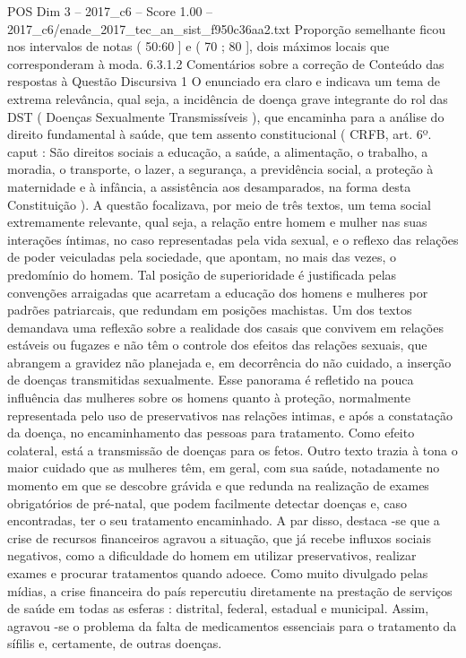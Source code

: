 \begin{textsample}{POS Dim 3 – 2017\_c6 – Score 1.00 – 2017\_c6/enade\_2017\_tec\_an\_sist\_f950c36aa2.txt}
Proporção semelhante ficou nos intervalos de notas ( 50:60 ] e ( 70 ; 80 ], dois máximos locais que corresponderam à moda. 6.3.1.2 Comentários sobre a correção de Conteúdo das respostas à Questão Discursiva 1 O enunciado era claro e indicava um tema de extrema relevância, qual seja, a incidência de doença grave integrante do rol das DST ( Doenças Sexualmente Transmissíveis ), que encaminha para a análise do direito fundamental à saúde, que tem assento constitucional ( CRFB, art. 6º. caput : São direitos sociais a educação, a saúde, a alimentação, o trabalho, a moradia, o transporte, o lazer, a segurança, a previdência social, a proteção à maternidade e à infância, a assistência aos desamparados, na forma desta Constituição ).
A questão focalizava, por meio de três textos, um tema social extremamente relevante, qual seja, a relação entre homem e mulher nas suas interações íntimas, no caso representadas pela vida sexual, e o reflexo das relações de poder veiculadas pela sociedade, que apontam, no mais das vezes, o predomínio do homem.
Tal posição de superioridade é justificada pelas convenções arraigadas que acarretam a educação dos homens e mulheres por padrões patriarcais, que redundam em posições machistas.
Um dos textos demandava uma reflexão sobre a realidade dos casais que convivem em relações estáveis ou fugazes e não têm o controle dos efeitos das relações sexuais, que abrangem a gravidez não planejada e, em decorrência do não cuidado, a inserção de doenças transmitidas sexualmente.
Esse panorama é refletido na pouca influência das mulheres sobre os homens quanto à proteção, normalmente representada pelo uso de preservativos nas relações intimas, e após a constatação da doença, no encaminhamento das pessoas para tratamento.
Como efeito colateral, está a transmissão de doenças para os fetos.
Outro texto trazia à tona o maior cuidado que as mulheres têm, em geral, com sua saúde, notadamente no momento em que se descobre grávida e que redunda na realização de exames obrigatórios de pré-natal, que podem facilmente detectar doenças e, caso encontradas, ter o seu tratamento encaminhado.
A par disso, destaca -se que a crise de recursos financeiros agravou a situação, que já recebe influxos sociais negativos, como a dificuldade do homem em utilizar preservativos, realizar exames e procurar tratamentos quando adoece.
Como muito divulgado pelas mídias, a crise financeira do país repercutiu diretamente na prestação de serviços de saúde em todas as esferas : distrital, federal, estadual e municipal.
Assim, agravou -se o problema da falta de medicamentos essenciais para o tratamento da sífilis e, certamente, de outras doenças.

\end{textsample}

